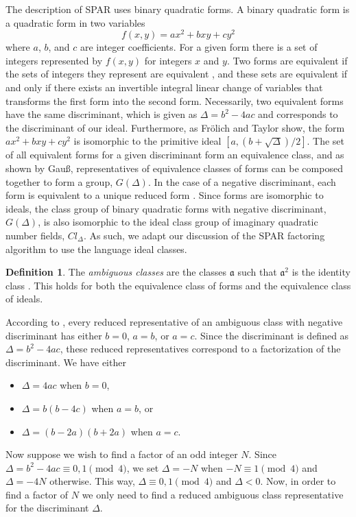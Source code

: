 \documentclass{ucalgthes1}
\theoremstyle{plain}
\theoremstyle{definition}
\newtheorem{defn}[thm]{Definition}
\begin{document}
The description of SPAR uses binary quadratic forms. A binary quadratic form is a quadratic form in two variables
\[
	f(x, y) = ax^2 + bxy + cy^2
\]
where $a$, $b$, and $c$ are integer coefficients.  For a given form there is a set of integers represented by $f(x, y)$ for integers $x$ and $y$. Two forms are equivalent if the sets of integers they represent are equivalent \cite[pp.239-240]{Crandall2005}, and these sets are equivalent if and only if there exists an invertible integral linear change of variables that transforms the first form into the second form. Necessarily, two equivalent forms have the same discriminant, which is given as $\Delta = b^2 - 4ac$ and corresponds to the discriminant of our ideal.  Furthermore, as Fr\"{o}lich and Taylor \cite{Frolich1993} show, the form $ax^2 + bxy + cy^2$ is isomorphic to the primitive ideal $[a, (b + \sqrt\Delta)/2]$.  The set of all equivalent forms for a given discriminant form an equivalence class, and as shown by Gau\ss \cite{Gauss1801}, representatives of equivalence classes of forms can be composed together to form a group, $G(\Delta)$.  In the case of a negative discriminant, each form is equivalent to a unique reduced form \cite{Guass1801}.  Since forms are isomorphic to ideals, the class group of binary quadratic forms with negative discriminant, $G(\Delta)$, is also isomorphic to the ideal class group of imaginary quadratic number fields, $Cl_\Delta$. As such, we adapt our discussion of the SPAR factoring algorithm to use the language ideal classes.

\begin{defn}
The \emph{ambiguous classes} are the classes $\mathfrak a$ such that ${\mathfrak a}^2$ is the identity class \cite{Schnorr1984}.  This holds for both the equivalence class of forms and the equivalence class of ideals.
\end{defn}

According to \cite{Schnorr1984}, every reduced representative of an ambiguous class with negative discriminant has either $b = 0$, $a = b$, or $a = c$.  Since the discriminant is defined as $\Delta = b^2 - 4ac$, these reduced representatives correspond to a factorization of the discriminant.  We have either
\begin{itemize}
\item $\Delta = 4ac$ when $b = 0$,
\item $\Delta = b(b - 4c)$ when $a = b$, or
\item $\Delta = (b - 2a)(b + 2a)$ when $a = c$.
\end{itemize}
Now suppose we wish to find a factor of an odd integer $N$. Since $\Delta = b^2 - 4ac \equiv 0, 1 \pmod 4$, we set $\Delta = -N$ when $-N \equiv 1 \pmod 4$ and $\Delta = -4N$ otherwise.  This way, $\Delta \equiv 0, 1 \pmod 4$ and $\Delta < 0$. Now, in order to find a factor of $N$ we only need to find a reduced ambiguous class representative for the discriminant $\Delta$.
\end{document}
